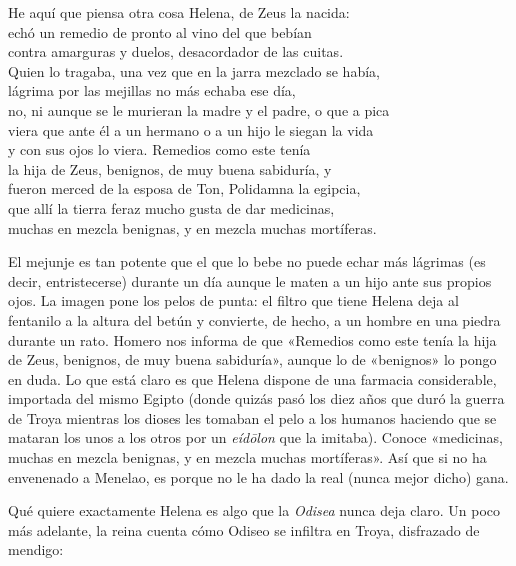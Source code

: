 \begin{versocita}
He aquí que piensa otra cosa Helena, de Zeus la nacida:\\
echó un remedio de pronto al vino del que bebían\\
contra amarguras y duelos, desacordador de las cuitas.\\
Quien lo tragaba, una vez que en la jarra mezclado se había,\\
lágrima por las mejillas no más echaba ese día,\\
no, ni aunque se le murieran la madre y el padre, o que a pica\\
viera que ante él a un hermano o a un hijo le siegan la vida\\
y con sus ojos lo viera. Remedios como este tenía\\
la hija de Zeus, benignos, de muy buena sabiduría, y\\
fueron merced de la esposa de Ton, Polidamna la egipcia,\\
que allí la tierra feraz mucho gusta de dar medicinas,\\
muchas en mezcla benignas, y en mezcla muchas mortíferas.
\end{versocita}

El mejunje es tan potente que el que lo bebe no puede echar más lágrimas (es decir, entristecerse) durante un día aunque le maten a un hijo ante sus propios ojos. La imagen pone los pelos de punta: el filtro que tiene Helena deja al fentanilo a la altura del betún y convierte, de hecho, a un hombre en una piedra durante un rato. Homero nos informa de que «Remedios como este tenía la hija de Zeus, benignos, de muy buena sabiduría», aunque lo de «benignos» lo pongo en duda. Lo que está claro es que Helena dispone de una farmacia considerable, importada del mismo Egipto (donde quizás pasó los diez años que duró la guerra de Troya mientras los dioses les tomaban el pelo a los humanos haciendo que se mataran los unos a los otros por un \emph{eídōlon} que la imitaba). Conoce «medicinas, muchas en mezcla benignas, y en mezcla muchas mortíferas». Así que si no ha envenenado a Menelao, es porque no le ha dado la real (nunca mejor dicho) gana.

Qué quiere exactamente Helena es algo que la \emph{Odisea} nunca deja claro. Un poco más adelante, la reina cuenta cómo Odiseo se infiltra en Troya, disfrazado de mendigo:

